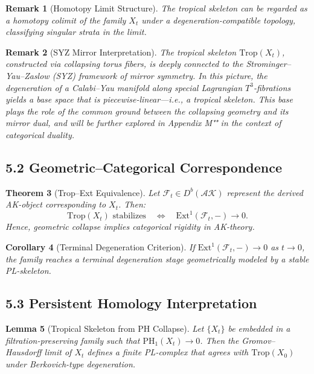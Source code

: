 \documentclass[11pt]{article}
\newtheorem{theorem}{Theorem}[section]
\newtheorem{remark}[theorem]{Remark}
\newtheorem{lemma}[theorem]{Lemma}
\newtheorem{corollary}[theorem]{Corollary}
\begin{document}
\begin{remark}[Homotopy Limit Structure]
The tropical skeleton can be regarded as a homotopy colimit of the family $X_t$ under a degeneration-compatible topology, classifying singular strata in the limit.
\end{remark}

\begin{remark}[SYZ Mirror Interpretation]
The tropical skeleton \( \mathrm{Trop}(X_t) \), constructed via collapsing torus fibers,  
is deeply connected to the Strominger–Yau–Zaslow (SYZ) framework of mirror symmetry.  
In this picture, the degeneration of a Calabi–Yau manifold along special Lagrangian \( T^3 \)-fibrations  
yields a base space that is piecewise-linear—i.e., a tropical skeleton.  
This base plays the role of the common ground between the collapsing geometry and its mirror dual,  
and will be further explored in Appendix M⁺⁺ in the context of categorical duality.
\end{remark}


\subsection{5.2 Geometric–Categorical Correspondence}

\begin{theorem}[Trop--Ext Equivalence]
Let $\mathcal{F}_t \in D^b(\mathcal{AK})$ represent the derived AK-object corresponding to $X_t$. Then:
\[
\mathrm{Trop}(X_t) \text{ stabilizes} \quad \Longleftrightarrow \quad \mathrm{Ext}^1(\mathcal{F}_t, -) \to 0.
\]
Hence, geometric collapse implies categorical rigidity in AK-theory.
\end{theorem}

\begin{corollary}[Terminal Degeneration Criterion]
If $\mathrm{Ext}^1(\mathcal{F}_t, -) \to 0$ as $t \to 0$, the family reaches a terminal degeneration stage geometrically modeled by a stable PL-skeleton.
\end{corollary}

\subsection{5.3 Persistent Homology Interpretation}

\begin{lemma}[Tropical Skeleton from PH Collapse]
Let $\{X_t\}$ be embedded in a filtration-preserving family such that $\mathrm{PH}_1(X_t) \to 0$. Then the Gromov--Hausdorff limit of $X_t$ defines a finite PL-complex that agrees with $\mathrm{Trop}(X_0)$ under Berkovich-type degeneration.
\end{lemma}
\end{document}
